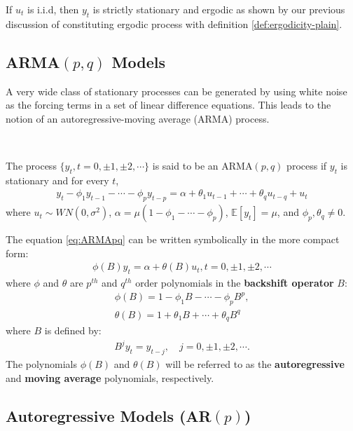 If $u_t$ is i.i.d, then $y_t$ is strictly stationary and ergodic as shown by our previous discussion of constituting ergodic process with definition \ref{def:ergodicity-plain}.

\subsection{ARMA\texorpdfstring{$(p,q)$}{(p,q)} Models}\label{sec:ARMApq}

A very wide class of stationary processes can be generated by using white
noise as the forcing terms in a set of linear difference equations. This leads to
the notion of an autoregressive-moving average (ARMA) process.

\begin{definition}\label{def:ARMApq}
    \
    
    The process $\{ y_t, t=0, \pm1, \pm2, \cdots\}$ is said to be an ARMA$(p,q)$ process if $y_t$ is stationary and for every $t$,
    \begin{gather}\label{eq:ARMApq}
        y_t - \phi_1 y_{t-1} - \cdots - \phi_p y_{t-p} = \alpha + \theta_1 u_{t-1} + \cdots + \theta_q u_{t-q} + u_t
    \end{gather}
    where $u_t \sim WN(0,\sigma^2)$, $\alpha = \mu \left( 1-\phi_1 - \cdots - \phi_p \right)$, $\mathbb{E}[y_t] = \mu$, and $\phi_p, \theta_q \neq 0.$
\end{definition}
The equation \ref{eq:ARMApq} can be written symbolically in the more compact form:
\begin{gather*}
    \phi (B) y_t = \alpha + \theta(B) u_t, t = 0, \pm1, \pm2, \cdots
\end{gather*}
where $\phi $ and $\theta$ are $p^{th}$ and $q^{th}$ order polynomials in the \textbf{backshift operator} $B$:
\begin{gather*}
    \phi (B) = 1 - \phi_1 B - \cdots - \phi_p B^p,\\
    \theta (B) = 1 + \theta_1 B + \cdots + \theta_q B^q
\end{gather*}
where $B$ is defined by:
\begin{gather*}
    B^j y_t = y_{t-j}, \quad j = 0, \pm1, \pm2, \cdots.
\end{gather*}
The polynomials $\phi(B)$ and $\theta(B)$ will be referred to as the \textbf{autoregressive} and \textbf{moving average} polynomials, respectively.

\subsection{Autoregressive Models (AR\texorpdfstring{$(p)$}{(p)})}\label{sec:AR}

